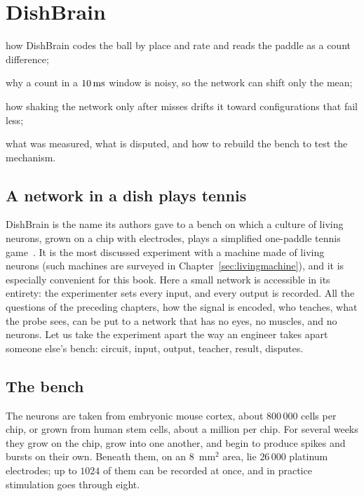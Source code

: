 \chapter{DishBrain}
\label{sec:dishbrain}
\begin{chaptergoals}
\item how DishBrain codes the ball by place and rate and reads the paddle as a count difference;
\item why a count in a $10\,\text{ms}$ window is noisy, so the network can shift only the mean;
\item how shaking the network only after misses drifts it toward configurations that fail less;
\item what was measured, what is disputed, and how to rebuild the bench to test the mechanism.
\end{chaptergoals}

\section{A network in a dish plays tennis}

DishBrain is the name its authors gave to a bench on which a culture of living neurons, grown on a chip with electrodes, plays a simplified one-paddle tennis game~\cite{Kagan2022}. It is the most discussed experiment with a machine made of living neurons (such machines are surveyed in Chapter~\ref{sec:livingmachine}), and it is especially convenient for this book. Here a small network is accessible in its entirety: the experimenter sets every input, and every output is recorded. All the questions of the preceding chapters, how the signal is encoded, who teaches, what the probe sees, can be put to a network that has no eyes, no muscles, and no  neurons. Let us take the experiment apart the way an engineer takes apart someone else's bench: circuit, input, output, teacher, result, disputes.

\section{The bench}

The neurons are taken from embryonic mouse cortex, about $800\,000$ cells per chip, or grown from human stem cells, about a million per chip. For several weeks they grow on the chip, grow into one another, and begin to produce spikes and bursts on their own. Beneath them, on an $8$~mm$^2$ area, lie $26\,000$ platinum electrodes; up to $1024$ of them can be recorded at once, and in practice stimulation goes through eight.

